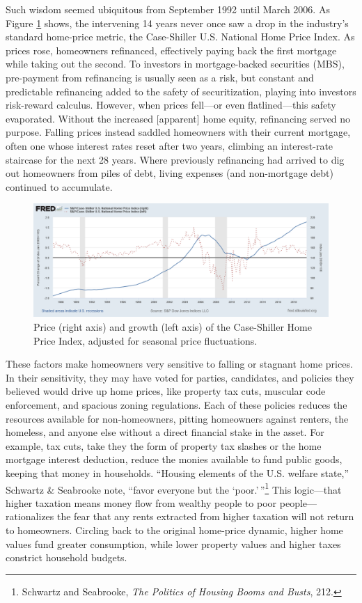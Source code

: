 \documentclass[12pt,oneside]{psthesis}
\begin{document}
Such wisdom seemed ubiquitous from September 1992 until March 2006.
As Figure \ref{fig:caseshiller} shows, the intervening 14 years never once saw a drop in the industry's standard home-price metric, the Case-Shiller U.S. National Home Price Index.
As prices rose, homeowners refinanced, effectively paying back the first mortgage while taking out the second.
To investors in mortgage-backed securities (MBS), pre-payment from refinancing is usually seen as a risk, but constant and predictable refinancing added to the safety of securitization, playing into investors risk-reward calculus.
However, when prices fell---or even flatlined---this safety evaporated.
Without the increased {[}apparent{]} home equity, refinancing served no purpose.
Falling prices instead saddled homeowners with their current mortgage, often one whose interest rates reset after two years, climbing an interest-rate staircase for the next 28 years.
Where previously refinancing had arrived to dig out homeowners from piles of debt, living expenses (and non-mortgage debt) continued to accumulate.
\begin{figure}

{\centering \includegraphics[width=0.9\linewidth]{figure/caseshiller_1990_2018} 

}

\caption{Price (right axis) and growth (left axis) of the Case-Shiller Home Price Index, adjusted for seasonal price fluctuations.}\label{fig:caseshiller}
\end{figure}
These factors make homeowners very sensitive to falling or stagnant home prices.
In their sensitivity, they may have voted for parties, candidates, and policies they believed would drive up home prices, like property tax cuts, muscular code enforcement, and spacious zoning regulations.
Each of these policies reduces the resources available for non-homeowners, pitting homeowners against renters, the homeless, and anyone else without a direct financial stake in the asset.
For example, tax cuts, take they the form of property tax slashes or the home mortgage interest deduction, reduce the monies available to fund public goods, keeping that money in households.
``Housing elements of the U.S. welfare state,'' Schwartz \& Seabrooke note, ``favor everyone but the `poor.'\,''\footnote{Schwartz and Seabrooke, \emph{The Politics of Housing Booms and Busts}, 212.}
This logic---that higher taxation means money flow from wealthy people to poor people---rationalizes the fear that any rents extracted from higher taxation will not return to homeowners.
Circling back to the original home-price dynamic, higher home values fund greater consumption, while lower property values and higher taxes constrict household budgets.
\end{document}
